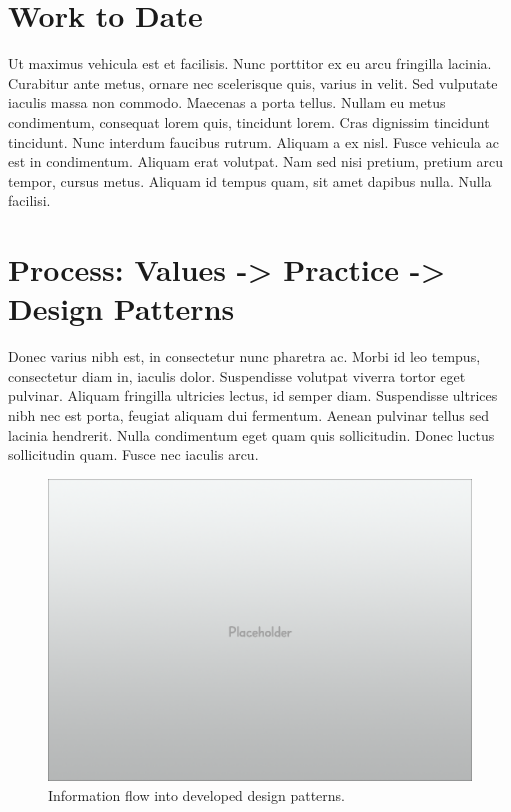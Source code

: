 \documentclass[final]{beamer}
\begin{document}
\begin{frame}[t]
\begin{multicols}{3}
\section{Work to Date}\label{work-to-date}

Ut maximus vehicula est et facilisis. Nunc porttitor ex eu arcu
fringilla lacinia. Curabitur ante metus, ornare nec scelerisque quis,
varius in velit. Sed vulputate iaculis massa non commodo. Maecenas a
porta tellus. Nullam eu metus condimentum, consequat lorem quis,
tincidunt lorem. Cras dignissim tincidunt tincidunt. Nunc interdum
faucibus rutrum. Aliquam a ex nisl. Fusce vehicula ac est in
condimentum. Aliquam erat volutpat. Nam sed nisi pretium, pretium arcu
tempor, cursus metus. Aliquam id tempus quam, sit amet dapibus nulla.
Nulla facilisi.

\section{Process: Values -\textgreater{} Practice -\textgreater{} Design
Patterns}\label{process-values---practice---design-patterns}

Donec varius nibh est, in consectetur nunc pharetra ac. Morbi id leo
tempus, consectetur diam in, iaculis dolor. Suspendisse volutpat viverra
tortor eget pulvinar. Aliquam fringilla ultricies lectus, id semper
diam. Suspendisse ultrices nibh nec est porta, feugiat aliquam dui
fermentum. Aenean pulvinar tellus sed lacinia hendrerit. Nulla
condimentum eget quam quis sollicitudin. Donec luctus sollicitudin quam.
Fusce nec iaculis arcu.

\begin{figure}[htbp]
\centering
\includegraphics{placeholder.png}
\caption{Information flow into developed design patterns.}
\end{figure}


\end{multicols}
\end{frame}
\end{document}
